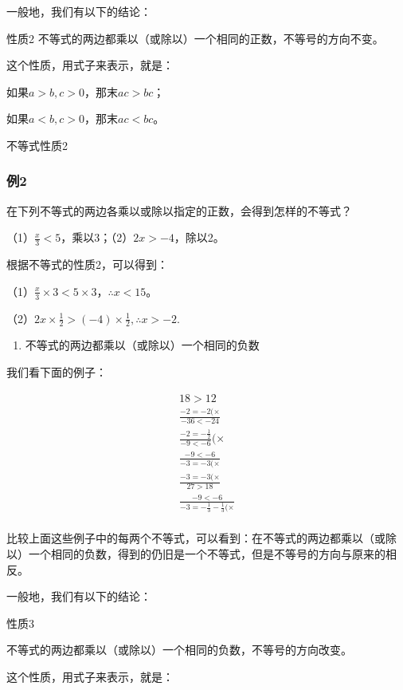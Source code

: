 一般地，我们有以下的结论：

性质2 不等式的两边都乘以（或除以）一个相同的正数，不等号的方向不变。

这个性质，用式子来表示，就是：

如果\(a > b, c > 0\)，那末\(ac > bc\)；

如果\(a < b, c > 0\)，那末\(ac < bc\)。

不等式性质2

\subsubsection{例2}

在下列不等式的两边各乘以或除以指定的正数，会得到怎样的不等式？

（1）\(\frac{x}{3} < 5\)，乘以3；（2）\(2x > -4\)，除以2。

 根据不等式的性质2，可以得到：

（1）\(\frac{x}{3} \times 3 < 5 \times 3\)，\(\therefore x < 15\)。

（2）\(2x \times \frac{1}{2} > (-4) \times \frac{1}{2}, \therefore x > -2.\)

\begin{enumerate}[start=3]
\item
  不等式的两边都乘以（或除以）一个相同的负数
\end{enumerate}

我们看下面的例子：

\[
\begin{array}{l} 18 > 12 \\ \frac{- 2 = - 2 (\times}{- 36 <   - 24} \\ \frac{- 2 = - \frac{1}{2}}{- 9 <   - 6} (\times \\ \frac{- 9 <   - 6}{- 3 = - 3 (\times} \\ \frac{- 3 = - 3 (\times}{27 > 18} \\ \frac{- 9 <   - 6}{- 3 = - \frac{1}{3} - \frac{1}{3} (\times} \\ \end{array}
\]

比较上面这些例子中的每两个不等式，可以看到：在不等式的两边都乘以（或除以）一个相同的负数，得到的仍旧是一个不等式，但是不等号的方向与原来的相反。

一般地，我们有以下的结论：

性质3

不等式的两边都乘以（或除以）一个相同的负数，不等号的方向改变。

这个性质，用式子来表示，就是：

